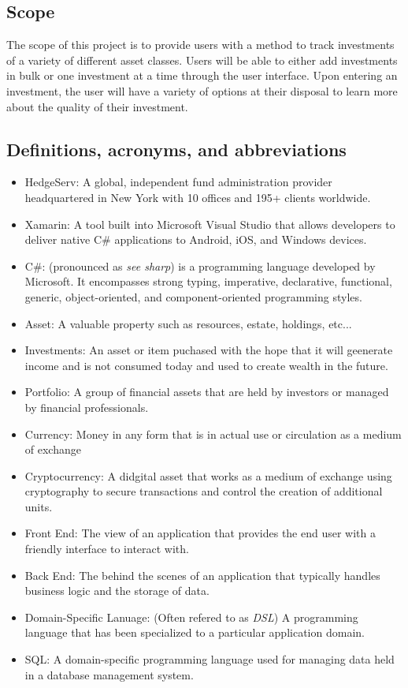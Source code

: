 \documentclass[onecolumn, draftclsnofoot,10pt, compsoc]{IEEEtran}
\begin{document}
\subsection{Scope}
The scope of this project is to provide users with a method to track investments of a variety of different asset classes. Users will be able to either add investments in bulk or one investment at a time through the user interface. Upon entering an investment, the user will have a variety of options at their disposal to learn more about the quality of their investment.

\subsection{Definitions, acronyms, and abbreviations}
\begin{itemize}
	\item HedgeServ: A global, independent fund administration provider headquartered in New York with
		10 offices and 195+ clients worldwide.
	\item Xamarin: A tool built into Microsoft Visual Studio that allows developers to deliver native 
	   	C\# applications to Android, iOS, and Windows devices.
	\item C\#: (pronounced as \textit{see sharp}) is a programming language developed by Microsoft. It encompasses strong typing, imperative, declarative, functional, generic,
		object-oriented, and component-oriented programming styles.
	\item Asset: A valuable property such as resources, estate, holdings, etc...
	\item Investments: An asset or item puchased with the hope that it will geenerate income and is not consumed today and used to create wealth in the future.
	\item Portfolio: A group of financial assets that are held by investors or managed by financial professionals.
	\item Currency: Money in any form that is in actual use or circulation as a medium of exchange
	\item Cryptocurrency: A didgital asset that works as a medium of  exchange using cryptography to secure transactions and control the creation of additional units.
	\item Front End: The view of an application that provides the end user with a friendly interface to interact with.
	\item Back End: The behind the scenes of an application that typically handles business logic and the storage of data.
	\item Domain-Specific Lanuage: (Often refered to as \textit{DSL}) A programming language that has been specialized to a particular application domain.
	\item SQL: A domain-specific programming language used for managing data held in a database management system.
\end{itemize}
\end{document}
